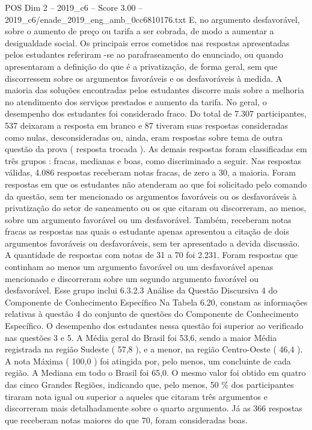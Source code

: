 \begin{textsample}{POS Dim 2 – 2019\_c6 – Score 3.00 – 2019\_c6/enade\_2019\_eng\_amb\_0cc6810176.txt}
E, no argumento desfavorável, sobre o aumento de preço ou tarifa a ser cobrada, de modo a aumentar a desigualdade social.
Os principais erros cometidos nas respostas apresentadas pelos estudantes referiram -se ao parafraseamento do enunciado, ou quando apresentaram a definição do que é a privatização, de forma geral, sem que discorressem sobre os argumentos favoráveis e os desfavoráveis à medida.
A maioria das soluções encontradas pelos estudantes discorre mais sobre a melhoria no atendimento dos serviços prestados e aumento da tarifa.
No geral, o desempenho dos estudantes foi considerado fraco.
Do total de 7.307 participantes, 537 deixaram a resposta em branco e 87 tiveram suas respostas consideradas como nulas, desconsideradas ou, ainda, eram respostas sobre tema de outra questão da prova ( resposta trocada ).
As demais respostas foram classificadas em três grupos : fracas, medianas e boas, como discriminado a seguir.
Nas respostas válidas, 4.086 respostas receberam notas fracas, de zero a 30, a maioria.
Foram respostas em que os estudantes não atenderam ao que foi solicitado pelo comando da questão, sem ter mencionado os argumentos favoráveis ou os desfavoráveis à privatização do setor de saneamento ou os que citaram ou discorreram, ao menos, sobre um argumento favorável ou um desfavorável.
Também, receberam notas fracas as respostas nas quais o estudante apenas apresentou a citação de dois argumentos favoráveis ou desfavoráveis, sem ter apresentado a devida discussão.
A quantidade de respostas com notas de 31 a 70 foi 2.231.
Foram respostas que continham ao menos um argumento favorável ou um desfavorável apenas mencionado e discorreram sobre um segundo argumento favorável ou desfavorável.
Esse grupo inclui 6.3.2.3 Análise da Questão Discursiva 4 do Componente de Conhecimento Específico Na Tabela 6.20, constam as informações relativas à questão 4 do conjunto de questões do Componente de Conhecimento Específico.
O desempenho dos estudantes nessa questão foi superior ao verificado nas questões 3 e 5.
A Média geral do Brasil foi 53,6, sendo a maior Média registrada na região Sudeste ( 57,8 ), e a menor, na região Centro-Oeste ( 46,4 ).
A nota Máxima ( 100,0 ) foi atingida por, pelo menos, um concluinte de cada região.
A Mediana em todo o Brasil foi 65,0.
O mesmo valor foi obtido em quatro das cinco Grandes Regiões, indicando que, pelo menos, 50 \% dos participantes tiraram nota igual ou superior a aqueles que citaram três argumentos e discorreram mais detalhadamente sobre o quarto argumento.
Já as 366 respostas que receberam notas maiores do que 70, foram consideradas boas.

\end{textsample}

